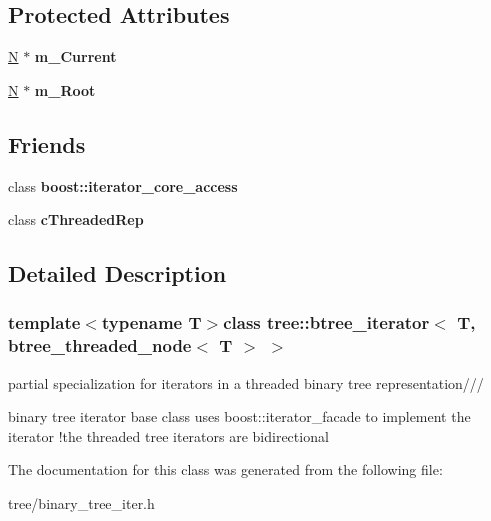 \subsection*{Protected Attributes}
\begin{DoxyCompactItemize}
\item 
\hypertarget{classtree_1_1btree__iterator_3_01T_00_01btree__threaded__node_3_01T_01_4_01_4_a95443920e3a32b37c162c69cd41e6c96}{\hyperlink{structtree_1_1btree__threaded__node}{N} $\ast$ {\bfseries m\-\_\-\-Current}}\label{classtree_1_1btree__iterator_3_01T_00_01btree__threaded__node_3_01T_01_4_01_4_a95443920e3a32b37c162c69cd41e6c96}

\item 
\hypertarget{classtree_1_1btree__iterator_3_01T_00_01btree__threaded__node_3_01T_01_4_01_4_a8be171dbc88d3daf451dee7d7b969bf3}{\hyperlink{structtree_1_1btree__threaded__node}{N} $\ast$ {\bfseries m\-\_\-\-Root}}\label{classtree_1_1btree__iterator_3_01T_00_01btree__threaded__node_3_01T_01_4_01_4_a8be171dbc88d3daf451dee7d7b969bf3}

\end{DoxyCompactItemize}
\subsection*{Friends}
\begin{DoxyCompactItemize}
\item 
\hypertarget{classtree_1_1btree__iterator_3_01T_00_01btree__threaded__node_3_01T_01_4_01_4_ac09f73e325921cc50ebcd96bed0f8096}{class {\bfseries boost\-::iterator\-\_\-core\-\_\-access}}\label{classtree_1_1btree__iterator_3_01T_00_01btree__threaded__node_3_01T_01_4_01_4_ac09f73e325921cc50ebcd96bed0f8096}

\item 
\hypertarget{classtree_1_1btree__iterator_3_01T_00_01btree__threaded__node_3_01T_01_4_01_4_a973123b4003243e31913a996b7af1422}{class {\bfseries c\-Threaded\-Rep}}\label{classtree_1_1btree__iterator_3_01T_00_01btree__threaded__node_3_01T_01_4_01_4_a973123b4003243e31913a996b7af1422}

\end{DoxyCompactItemize}


\subsection{Detailed Description}
\subsubsection*{template$<$typename T$>$class tree\-::btree\-\_\-iterator$<$ T, btree\-\_\-threaded\-\_\-node$<$ T $>$ $>$}

partial specialization for iterators in a threaded binary tree representation///

binary tree iterator base class uses boost\-::iterator\-\_\-facade to implement the iterator !the threaded tree iterators are bidirectional 

The documentation for this class was generated from the following file\-:\begin{DoxyCompactItemize}
\item 
tree/binary\-\_\-tree\-\_\-iter.\-h\end{DoxyCompactItemize}

